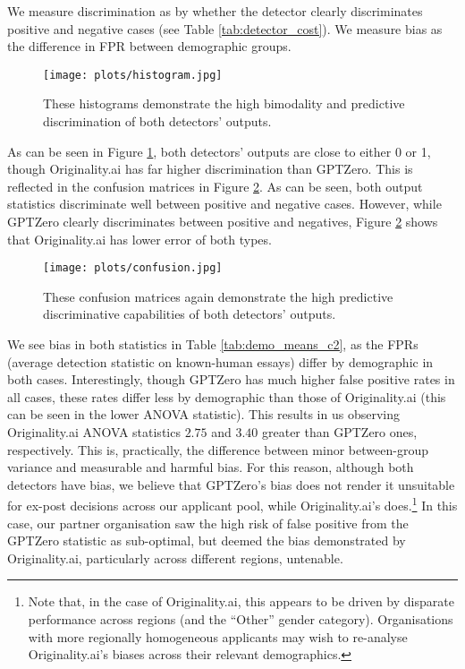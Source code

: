 We measure discrimination as by whether the detector clearly discriminates positive and negative cases (see Table \ref{tab:detector_cost}). We measure bias as the difference in FPR between demographic groups.

\begin{figure}[htb]
  \centering
  \texttt{[image: plots/histogram.jpg]}
  \caption{These histograms demonstrate the high bimodality and predictive discrimination of both detectors' outputs.}
  \label{fig:histogram}
\end{figure}

As can be seen in Figure \ref{fig:histogram}, both detectors' outputs are close to either 0 or 1, though Originality.ai has far higher discrimination than GPTZero. This is reflected in the confusion matrices in Figure \ref{fig:confusion}. As can be seen, both output statistics discriminate well between positive and negative cases. However, while GPTZero clearly discriminates between positive and negatives, Figure \ref{fig:confusion} shows that Originality.ai has lower error of both types.

\begin{figure}[htb]
  \centering
  \texttt{[image: plots/confusion.jpg]}
  \caption{These confusion matrices again demonstrate the high predictive discriminative capabilities of both detectors' outputs.}
  \label{fig:confusion}
\end{figure}

We see bias in both statistics in Table \ref{tab:demo_means_c2}, as the FPRs (average detection statistic on known-human essays) differ by demographic in both cases. Interestingly, though GPTZero has much higher false positive rates in all cases, these rates differ less by demographic than those of Originality.ai (this can be seen in the lower ANOVA statistic). This results in us observing Originality.ai ANOVA statistics $2.75$ and $3.40$ greater than GPTZero ones, respectively. This is, practically, the difference between minor between-group variance and measurable and harmful bias. For this reason, although both detectors have bias, we believe that GPTZero's bias does not render it unsuitable for ex-post decisions across our applicant pool, while Originality.ai's does.\footnote{Note that, in the case of Originality.ai, this appears to be driven by disparate performance across regions (and the ``Other'' gender category). Organisations with more regionally homogeneous applicants may wish to re-analyse Originality.ai's biases across their relevant demographics.} In this case, our partner organisation saw the high risk of false positive from the GPTZero statistic as sub-optimal, but deemed the bias demonstrated by Originality.ai, particularly across different regions, untenable.

